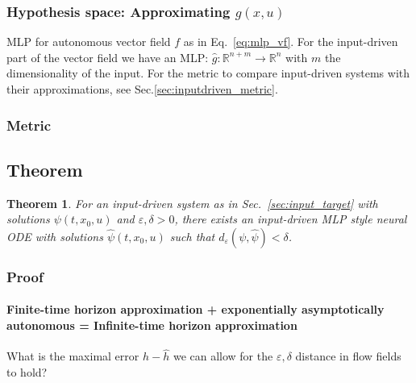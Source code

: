 \documentclass{article}
\newtheorem{theorem}{Theorem}
\theoremstyle{definition} \newtheorem{definition}{Definition}
\theoremstyle{remark} \newtheorem{remark}{Remark}
\newcommand{\reals}{\mathbb{R}}
\newcounter{ct}
\begin{document}



\subsubsection{Hypothesis space: Approximating $g(x,u)$}\label{sec:input_hypothesis} %
MLP for autonomous vector field $f$ as in Eq.~\ref{eq:mlp_vf}.
For the input-driven part of the vector field we have an MLP:
 $\hat g\colon \reals^{n+m} \rightarrow \reals^{n}$ with $m$ the dimensionality of the input.
%
For the metric to compare input-driven systems with their approximations, see Sec.\ref{sec:inputdriven_metric}.


\subsubsection{Metric}\label{sec:input_metric} 


\subsection{Theorem}
\begin{theorem}
For an input-driven system as in Sec.~\ref{sec:input_target} %
with solutions  $\psi(t,x_0,u)$
and $\varepsilon, \delta>0$, there exists an input-driven MLP style neural ODE %
with solutions  $\hat \psi(t,x_0,u)$ such that 
$d_\varepsilon(\psi,\hat\psi)<\delta$.
\end{theorem}


\subsubsection{Proof}
\paragraph{Finite-time horizon approximation + exponentially asymptotically autonomous = Infinite-time horizon approximation}
What is the maximal error $h-\hat h$ we can allow for the $\varepsilon,\delta$ distance in flow fields to hold?
\end{document}
